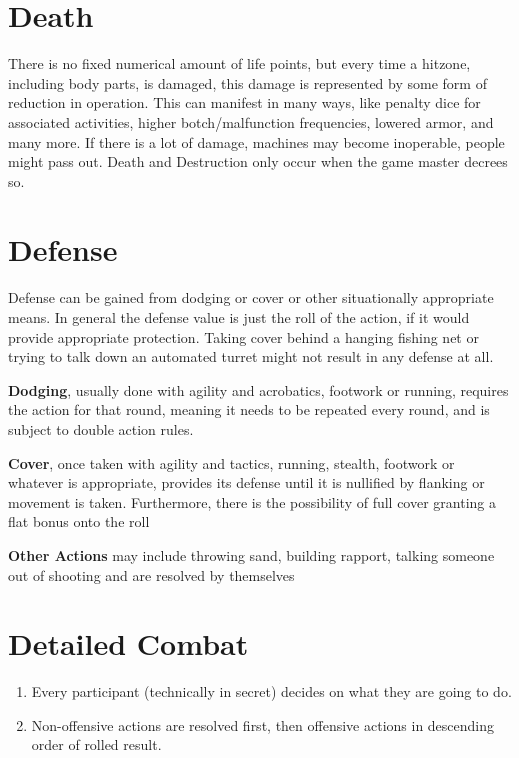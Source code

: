 \section{Death}\label{sec:combat-death}
There is no fixed numerical amount of life points, but every time a hitzone, including body parts, is damaged,
this damage is represented by some form of reduction in operation.
This can manifest in many ways, like penalty dice for associated activities, higher botch/malfunction frequencies,
lowered armor, and many more.
If there is a lot of damage, machines may become inoperable, people might pass out.
Death and Destruction only occur when the game master decrees so.

\section{Defense}\label{sec:combat-defense}
Defense can be gained from dodging or cover or other situationally appropriate means.
In general the defense value is just the roll of the action, if it would provide appropriate protection.
Taking cover behind a hanging fishing net or trying to talk down an automated turret might not result in any defense
at all.

\textbf{Dodging}, usually done with agility and acrobatics, footwork or running, requires the action for that round,
meaning it needs to be repeated every round, and is subject to double action rules.

\textbf{Cover}, once taken with agility and tactics, running, stealth, footwork or whatever is appropriate,
provides its defense until it is nullified by flanking or movement is taken.
Furthermore, there is the possibility of full cover granting a flat bonus onto the roll

\textbf{Other Actions} may include throwing sand, building rapport, talking someone out of shooting and are resolved
by themselves


\section{Detailed Combat}\label{sec:detailed-combat}
\begin{enumerate}
    \item Every participant (technically in secret) decides on what they are going to do.
    \item Non-offensive actions are resolved first, then offensive actions in descending order of rolled result.
\end{enumerate}



